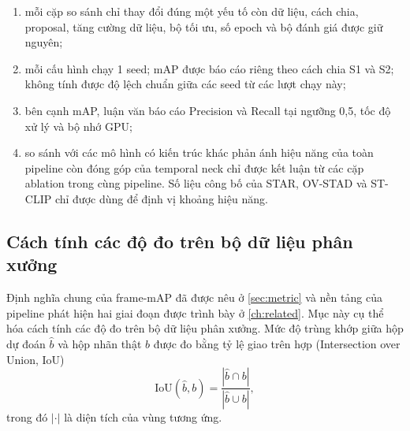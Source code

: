 \begin{enumerate}
  \item mỗi cặp so sánh chỉ thay đổi đúng một yếu tố còn dữ liệu, cách chia, proposal, tăng cường dữ liệu, bộ tối ưu, số epoch và bộ đánh giá được giữ nguyên;
  \item mỗi cấu hình chạy 1 seed; mAP được báo cáo riêng theo cách chia S1 và S2; không tính được độ lệch chuẩn giữa các seed từ các lượt chạy này;
  \item bên cạnh mAP, luận văn báo cáo Precision và Recall tại ngưỡng 0,5, tốc độ xử lý và bộ nhớ GPU;
  \item so sánh với các mô hình có kiến trúc khác phản ánh hiệu năng của toàn pipeline còn đóng góp của temporal neck chỉ được kết luận từ các cặp ablation trong cùng pipeline. Số liệu công bố của STAR, OV-STAD và ST-CLIP chỉ được dùng để định vị khoảng hiệu năng.
\end{enumerate}

\subsection{Cách tính các độ đo trên bộ dữ liệu phân xưởng}
\label{sec:metric-calc}

Định nghĩa chung của frame-mAP đã được nêu ở \cref{sec:metric} và nền tảng của pipeline phát hiện hai giai đoạn được trình bày ở \cref{ch:related}. Mục này cụ thể hóa cách tính các độ đo trên bộ dữ liệu phân xưởng. Mức độ trùng khớp giữa hộp dự đoán $\hat b$ và hộp nhãn thật $b$ được đo bằng tỷ lệ giao trên hợp (Intersection over Union, IoU)
\begin{equation}
\mathrm{IoU}(\hat b, b) = \frac{|\hat b \cap b|}{|\hat b \cup b|},
\label{eq:iou-factory}
\end{equation}
trong đó $|\cdot|$ là diện tích của vùng tương ứng.

